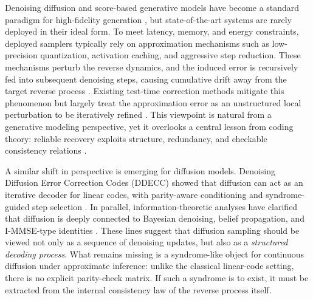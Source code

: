 \documentclass{article}
\theoremstyle{plain}
\theoremstyle{definition}
\theoremstyle{remark}
\begin{document}
Denoising diffusion and score-based generative models have become a standard
paradigm for high-fidelity generation \citep{ho2020ddpm,song2021sde}, but
state-of-the-art systems are rarely deployed in their ideal form. To meet
latency, memory, and energy constraints, deployed samplers typically rely on
approximation mechanisms such as low-precision quantization, activation
caching, and aggressive step reduction. These mechanisms perturb the reverse
dynamics, and the induced error is recursively fed into subsequent denoising
steps, causing cumulative drift away from the target reverse process
\citep{zhong2026iec}. Existing test-time correction methods mitigate this
phenomenon but largely treat the approximation error as an unstructured local
perturbation to be iteratively refined \citep{zhong2026iec,yao2024tac}. This
viewpoint is natural from a generative modeling perspective, yet it overlooks
a central lesson from coding theory: reliable recovery exploits structure,
redundancy, and checkable consistency relations \citep{shannon1948,gallager1962,
berrou1993turbo}.

A similar shift in perspective is emerging for diffusion models. Denoising
Diffusion Error Correction Codes (DDECC) showed that diffusion can act as an
iterative decoder for linear codes, with parity-aware conditioning and
syndrome-guided step selection \citep{choukroun2023ddecc}. In parallel,
information-theoretic analyses have clarified that diffusion is deeply
connected to Bayesian denoising, belief propagation, and I-MMSE-type
identities \citep{guo2005immse,kong2023itdiffusion,mei2025unetbp,
reeves2025itproofs}. These lines suggest that diffusion sampling should be
viewed not only as a sequence of denoising updates, but also as a
\emph{structured decoding process}. What remains missing is a syndrome-like
object for continuous diffusion under approximate inference: unlike the
classical linear-code setting, there is no explicit parity-check matrix. If
such a syndrome is to exist, it must be extracted from the internal
consistency law of the reverse process itself.
\end{document}

